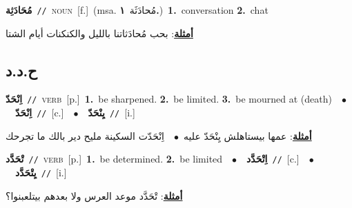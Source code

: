 \documentclass[10pt,a4paper,twoside]{article} %
\begin{document}
\begin{multicols}{2}
{\setlength\topsep{0pt}\textbf{\foreignlanguage{arabic}{مُحَادَثِة}}\ {\color{gray}\texttt{//}\color{black}}\ \textsc{noun}\ [f.]\ \color{gray}(msa. \foreignlanguage{arabic}{مُحادَثَة}~\foreignlanguage{arabic}{\textbf{١.}})\color{black}\ \textbf{1.}~conversation  \textbf{2.}~chat\  \begin{flushright}\color{gray}\foreignlanguage{arabic}{\textbf{\underline{\foreignlanguage{arabic}{أمثلة}}}: بحب مُحادَثاتنا بالليل والكنكنات أيام الشتا}\end{flushright}\color{black}} \vspace{2mm}

\vspace{-3mm}
\subsection*{\color{blue}\foreignlanguage{arabic}{ح.د.د}\color{blue}{}} 

{\setlength\topsep{0pt}\textbf{\foreignlanguage{arabic}{اِنْحَدّ}}\ {\color{gray}\texttt{//}\color{black}}\ \textsc{verb}\ [p.]\ \textbf{1.}~be sharpened.  \textbf{2.}~be limited.  \textbf{3.}~be mourned at (death)\ \ $\bullet$\ \ \setlength\topsep{0pt}\textbf{\foreignlanguage{arabic}{اِنْحَدّ}}\ {\color{gray}\texttt{//}\color{black}}\ [c.]\ \ $\bullet$\ \ \setlength\topsep{0pt}\textbf{\foreignlanguage{arabic}{يِنْحَدّ}}\ {\color{gray}\texttt{//}\color{black}}\ [i.]\  \begin{flushright}\color{gray}\foreignlanguage{arabic}{\textbf{\underline{\foreignlanguage{arabic}{أمثلة}}}: عمها بيستاهلش يِنْحَدّ عليه\ $\bullet$\ \  اِنْحَدّت السكينة مليح دير بالك ما تجرحك}\end{flushright}\color{black}} \vspace{2mm}

{\setlength\topsep{0pt}\textbf{\foreignlanguage{arabic}{تْحَدَّد}}\ {\color{gray}\texttt{//}\color{black}}\ \textsc{verb}\ [p.]\ \textbf{1.}~be determined.  \textbf{2.}~be limited\ \ $\bullet$\ \ \setlength\topsep{0pt}\textbf{\foreignlanguage{arabic}{اِتْحَدَّد}}\ {\color{gray}\texttt{//}\color{black}}\ [c.]\ \ $\bullet$\ \ \setlength\topsep{0pt}\textbf{\foreignlanguage{arabic}{يِتْحَدَّد}}\ {\color{gray}\texttt{//}\color{black}}\ [i.]\  \begin{flushright}\color{gray}\foreignlanguage{arabic}{\textbf{\underline{\foreignlanguage{arabic}{أمثلة}}}: تْحَدَّد موعد العرس ولا بعدهم بيتلعبنوا؟}\end{flushright}\color{black}} \vspace{2mm}


\end{multicols}
\end{document}

